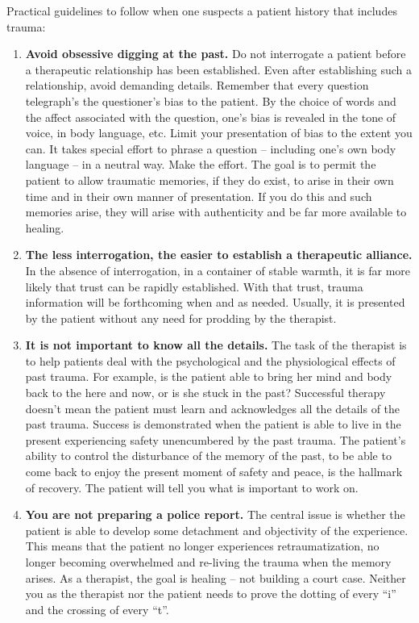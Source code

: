 \documentclass[]{book}
\begin{document}
Practical guidelines to follow when one suspects a patient history that includes trauma:

\begin{enumerate}
\def\labelenumi{\arabic{enumi}.}
\item
  \textbf{Avoid obsessive digging at the past.} Do not interrogate a patient before a therapeutic relationship has been established. Even after establishing such a relationship, avoid demanding details. Remember that every question telegraph's the questioner's bias to the patient. By the choice of words and the affect associated with the question, one's bias is revealed in the tone of voice, in body language, etc. Limit your presentation of bias to the extent you can. It takes special effort to phrase a question -- including one's own body language -- in a neutral way. Make the effort. The goal is to permit the patient to allow traumatic memories, if they do exist, to arise in their own time and in their own manner of presentation. If you do this and such memories arise, they will arise with authenticity and be far more available to healing.
\item
  \textbf{The less interrogation, the easier to establish a therapeutic alliance.} In the absence of interrogation, in a container of stable warmth, it is far more likely that trust can be rapidly established. With that trust, trauma information will be forthcoming when and as needed. Usually, it is presented by the patient without any need for prodding by the therapist.
\item
  \textbf{It is not important to know all the details.} The task of the therapist is to help patients deal with the psychological and the physiological effects of past trauma. For example, is the patient able to bring her mind and body back to the here and now, or is she stuck in the past? Successful therapy doesn't mean the patient must learn and acknowledges all the details of the past trauma. Success is demonstrated when the patient is able to live in the present experiencing safety unencumbered by the past trauma. The patient's ability to control the disturbance of the memory of the past, to be able to come back to enjoy the present moment of safety and peace, is the hallmark of recovery. The patient will tell you what is important to work on.
\item
  \textbf{You are not preparing a police report.} The central issue is whether the patient is able to develop some detachment and objectivity of the experience. This means that the patient no longer experiences retraumatization, no longer becoming overwhelmed and re-living the trauma when the memory arises. As a therapist, the goal is healing -- not building a court case. Neither you as the therapist nor the patient needs to prove the dotting of every ``i'' and the crossing of every ``t''.

\end{enumerate}
\end{document}
